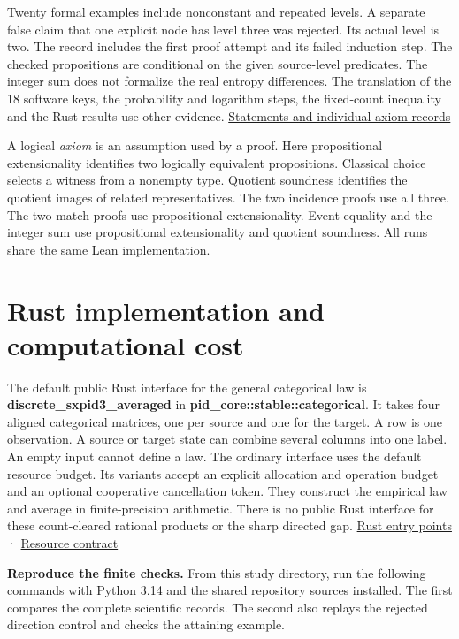 Twenty formal examples include nonconstant and repeated levels. A separate false claim that one explicit node has level three was rejected. Its actual level is two. The record includes the first proof attempt and its failed induction step. The checked propositions are conditional on the given source-level predicates. The integer sum does not formalize the real entropy differences. The translation of the 18 software keys, the probability and logarithm steps, the fixed-count inequality and the Rust results use other evidence. \href{https://github.com/sepahead/pid-rs/blob/main/audit/research/nested-categorical-sources/stock/README.md}{Statements and individual axiom records}

A logical \emph{axiom} is an assumption used by a proof. Here propositional extensionality identifies two logically equivalent propositions. Classical choice selects a witness from a nonempty type. Quotient soundness identifies the quotient images of related representatives. The two incidence proofs use all three. The two match proofs use propositional extensionality. Event equality and the integer sum use propositional extensionality and quotient soundness. All runs share the same Lean implementation.

\clearpage

\section{Rust implementation and computational cost}\label{rust-implementation-and-computational-cost}

The default public Rust interface for the general categorical law is \textbf{discrete\_sxpid3\_averaged} in \textbf{pid\_core::stable::categorical}. It takes four aligned categorical matrices, one per source and one for the target. A row is one observation. A source or target state can combine several columns into one label. An empty input cannot define a law. The ordinary interface uses the default resource budget. Its variants accept an explicit allocation and operation budget and an optional cooperative cancellation token. They construct the empirical law and average in finite-precision arithmetic. There is no public Rust interface for these count-cleared rational products or the sharp directed gap. \href{https://github.com/sepahead/pid-rs/blob/main/crates/pid-core/src/sxpid.rs}{Rust entry points} · \href{https://github.com/sepahead/pid-rs/blob/main/RUST_IMPLEMENTATION_AND_COST.md}{Resource contract}

\textbf{Reproduce the finite checks.} From this study directory, run the following commands with Python 3.14 and the shared repository sources installed. The first compares the complete scientific records. The second also replays the rejected direction control and checks the attaining example.

